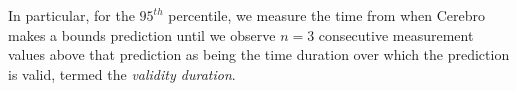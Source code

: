 In particular, for the $95^{th}$ percentile, we measure the time from when
Cerebro makes a bounds prediction until we observe $n=3$ consecutive
measurement values above that prediction as being the time duration over which
the prediction is valid, termed the \textit{validity duration}.  




